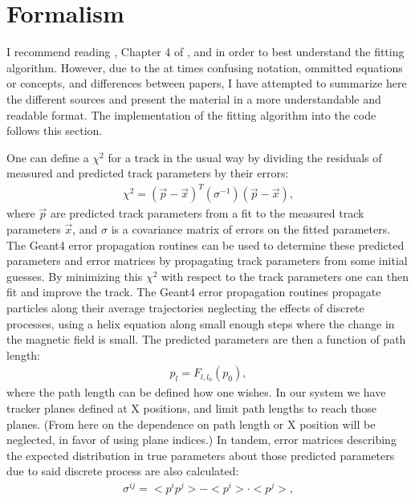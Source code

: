 \section{Formalism}
\label{sec:Formalism}

    I recommend reading \cite{geanemanual}, Chapter 4 of \cite{Lavezzi}, and \cite{trajfit} in order to best understand the fitting algorithm. However, due to the at times confusing notation, ommitted equations or concepts, and differences between papers, I have attempted to summarize here the different sources and present the material in a more understandable and readable format. The implementation of the fitting algorithm into the code follows this section.

    One can define a $\chi^{2}$ for a track in the usual way by dividing the residuals of measured and predicted track parameters by their errors:
        \begin{align} \label{eq:chi2}
            \chi^2 = (\vec{p}-\vec{x})^{T} (\sigma^{-1}) (\vec{p}-\vec{x}),
        \end{align}
    where $\vec{p}$ are predicted track parameters from a fit to the measured track parameters $\vec{x}$, and $\sigma$ is a covariance matrix of errors on the fitted parameters. The Geant4 error propagation routines can be used to determine these predicted parameters and error matrices by propagating track parameters from some initial guesses. By minimizing this $\chi^{2}$ with respect to the track parameters one can then fit and improve the track. The Geant4 error propagation routines propagate particles along their average trajectories neglecting the effects of discrete processes, using a helix equation along small enough steps where the change in the magnetic field is small. The predicted parameters are then a function of path length: 
        \begin{align} \label{eq:pp}
            p_{l} = F_{l,l_{0}}(p_{0}),
        \end{align}
    where the path length can be defined how one wishes. In our system we have tracker planes defined at X positions, and limit path lengths to reach those planes. (From here on the dependence on path length or X position will be neglected, in favor of using plane indices.) In tandem, error matrices describing the expected distribution in true parameters about those predicted parameters due to said discrete process are also calculated:
        \begin{align} \label{eq:sigma}
            \sigma^{ij} = <p^{i}p^{j}> - <p^{i}> \cdot <p^{j}>,
        \end{align} 
